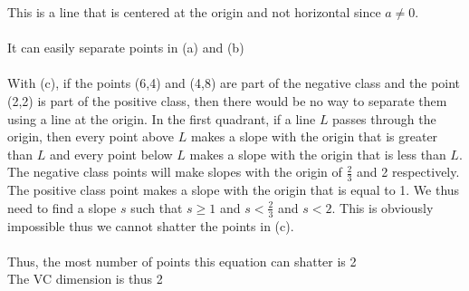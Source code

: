 \documentclass[twoside,11pt]{article}
\theoremstyle{definition}
\begin{document}
This is a line that is centered at the origin and not horizontal since $a \neq 0$. \\
\\
It can easily separate points in (a) and (b)\\
\\
With (c), if the points (6,4) and (4,8) are part of the negative class and the point (2,2) is part of the positive class, then there would be no way to separate them using a line at the origin. In the first quadrant, if a line $L$ passes through the origin, then every point above $L$ makes a slope with the origin that is greater than $L$ and every point below $L$ makes a slope with the origin that is less than $L$. The negative class points will make slopes with the origin of $\frac{2}{3}$ and 2 respectively. The positive class point makes a slope with the origin that is equal to 1. We thus need to find a slope $s$ such that $s \geq 1$ and $s < \frac{2}{3}$ and $s<2$. This is obviously impossible thus we cannot shatter the points in (c).\\
\\
Thus, the most number of points this equation can shatter is 2\\
The VC dimension is thus 2
\end{document}
